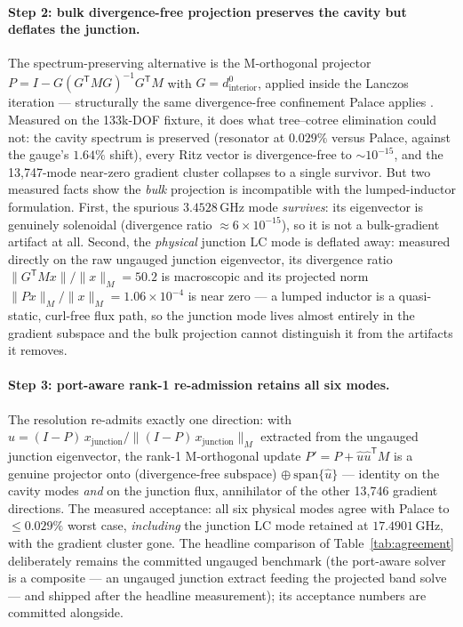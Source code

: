 \documentclass{anvil-paper}
\begin{document}
\paragraph{Step 2: bulk divergence-free projection preserves the cavity
but deflates the junction.}
The spectrum-preserving alternative is the M-orthogonal projector
$P = I - G(G^{\mathsf{T}}MG)^{-1}G^{\mathsf{T}}M$ with
$G = d^0_{\mathrm{interior}}$, applied inside the Lanczos iteration ---
structurally the same divergence-free confinement Palace applies
\citep{palace}. Measured on the 133k-DOF fixture, it does what tree--cotree
elimination could not: the cavity spectrum is preserved (resonator at
$0.029\%$ versus Palace, against the gauge's $1.64\%$ shift), every Ritz
vector is divergence-free to ${\sim}10^{-15}$, and the 13{,}747-mode
near-zero gradient cluster collapses to a single survivor. But two
measured facts show the \emph{bulk} projection is incompatible with the
lumped-inductor formulation. First, the spurious $3.4528$\,GHz mode
\emph{survives}: its eigenvector is genuinely solenoidal
(divergence ratio ${\approx}6\times 10^{-15}$), so it is not a
bulk-gradient artifact at all. Second, the \emph{physical} junction LC
mode is deflated away: measured directly on the raw ungauged junction
eigenvector, its divergence ratio
$\lVert G^{\mathsf{T}}Mx\rVert/\lVert x\rVert_M = 50.2$ is macroscopic and
its projected norm $\lVert Px\rVert_M/\lVert x\rVert_M = 1.06\times10^{-4}$
is near zero --- a lumped inductor is a quasi-static, curl-free flux path,
so the junction mode lives almost entirely in the gradient subspace and
the bulk projection cannot distinguish it from the artifacts it removes.

\paragraph{Step 3: port-aware rank-1 re-admission retains all six modes.}
The resolution re-admits exactly one direction: with
$\hat{u} = (I-P)\,x_{\mathrm{junction}} /
\lVert (I-P)\,x_{\mathrm{junction}}\rVert_M$ extracted from the ungauged
junction eigenvector, the rank-1 M-orthogonal update
$P' = P + \hat{u}\hat{u}^{\mathsf{T}}M$ is a genuine projector onto
(divergence-free subspace) $\oplus\ \mathrm{span}\{\hat{u}\}$ --- identity
on the cavity modes \emph{and} on the junction flux, annihilator of the
other 13{,}746 gradient directions. The measured acceptance: all six
physical modes agree with Palace to $\leq 0.029\%$ worst case,
\emph{including} the junction LC mode retained at $17.4901$\,GHz, with the
gradient cluster gone. The headline comparison of
Table~\ref{tab:agreement} deliberately remains the committed ungauged
benchmark (the port-aware solver is a composite --- an ungauged junction
extract feeding the projected band solve --- and shipped after the
headline measurement); its acceptance numbers are committed alongside.
\end{document}
